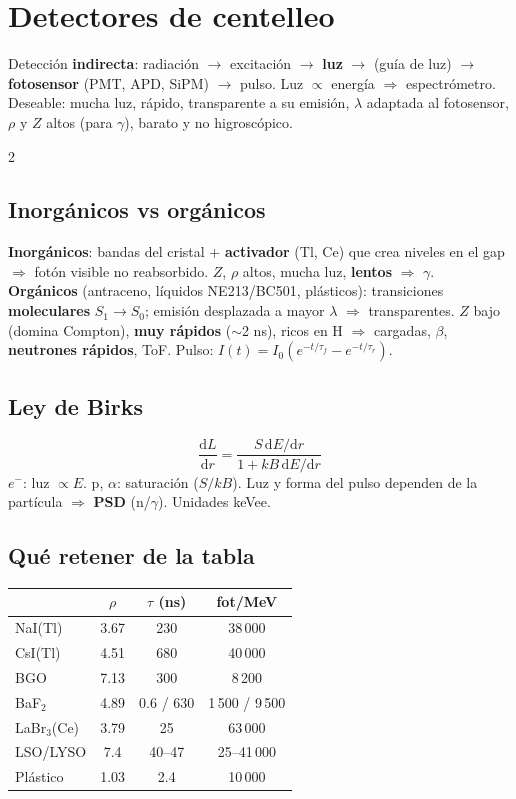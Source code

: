 \documentclass[10pt,a4paper]{article}
\newcommand{\imp}[1]{\textbf{\color{BrickRed}#1}}
\begin{document}
\section{Detectores de centelleo}
\begin{clave}[Principio]
Detección \textbf{indirecta}: radiación $\to$ excitación $\to$ \textbf{luz} $\to$ (guía de luz) $\to$ \textbf{fotosensor} (PMT, APD, SiPM) $\to$ pulso. Luz $\propto$ energía $\Rightarrow$ espectrómetro.
Deseable: mucha luz, rápido, transparente a su emisión, $\lambda$ adaptada al fotosensor, $\rho$ y $Z$ altos (para $\gamma$), barato y no higroscópico.
\end{clave}
\begin{multicols}{2}
\subsection{Inorgánicos vs orgánicos}
\textbf{Inorgánicos}: bandas del cristal + \textbf{activador} (Tl, Ce) que crea niveles en el gap $\Rightarrow$ fotón visible no reabsorbido. $Z$, $\rho$ altos, mucha luz, \textbf{lentos} $\Rightarrow$ \imp{$\gamma$}.\\
\textbf{Orgánicos} (antraceno, líquidos NE213/BC501, plásticos): transiciones \textbf{moleculares} $S_1\to S_0$; emisión desplazada a mayor $\lambda$ $\Rightarrow$ transparentes. $Z$ bajo (domina Compton), \imp{muy rápidos} ($\sim$2 ns), ricos en H $\Rightarrow$ cargadas, $\beta$, \imp{neutrones rápidos}, ToF.
Pulso: $I(t)=I_0(e^{-t/\tau_f}-e^{-t/\tau_r})$.
\subsection{Ley de Birks}
\[ \frac{\mathrm{d}L}{\mathrm{d}r}=\frac{S\,\mathrm{d}E/\mathrm{d}r}{1+kB\,\mathrm{d}E/\mathrm{d}r} \]
$e^-$: luz $\propto E$. p, $\alpha$: saturación ($S/kB$). Luz y forma del pulso dependen de la partícula $\Rightarrow$ \imp{PSD} (n/$\gamma$). Unidades keVee.
\subsection{Qué retener de la tabla}
\begin{tabular}{@{}lccc@{}}
\toprule
& $\rho$ & $\tau$ (ns) & fot/MeV\\\midrule
NaI(Tl) & 3.67 & 230 & 38\,000\\
CsI(Tl) & 4.51 & 680 & 40\,000\\
BGO & 7.13 & 300 & 8\,200\\
BaF$_2$ & 4.89 & 0.6 / 630 & 1\,500 / 9\,500\\
LaBr$_3$(Ce) & 3.79 & 25 & 63\,000\\
LSO/LYSO & 7.4 & 40--47 & 25--41\,000\\
Plástico & 1.03 & 2.4 & 10\,000\\\bottomrule
\end{tabular}


\end{multicols}
\end{document}
